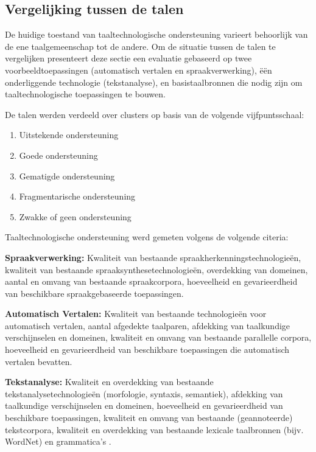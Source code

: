 \documentclass[]{../../metanetpaper}
\begin{document}
\begin{multicols}{2}
\subsection{Vergelijking tussen de talen}

De huidige toestand van taaltechnologische ondersteuning  varieert behoorlijk van de ene taalgemeenschap tot de andere. Om de situatie tussen de talen te vergelijken presenteert deze sectie een evaluatie gebaseerd op twee voorbeeldtoepassingen (automatisch vertalen en spraakverwerking), {\"e}{\"e}n onderliggende technologie (tekstanalyse), en basistaalbronnen die nodig zijn om taaltechnologische toepassingen te bouwen.

De talen werden verdeeld over clusters op basis van de volgende vijfpuntsschaal:

\begin{enumerate}
\item Uitstekende ondersteuning 
\item Goede ondersteuning
\item Gematigde ondersteuning
\item  Fragmentarische ondersteuning
\item Zwakke of geen ondersteuning
\end{enumerate}

Taaltechnologische ondersteuning werd gemeten volgens de volgende citeria:

\textbf{Spraakverwerking:} Kwaliteit van bestaande spraakherkenningstechnologie{\"e}n, kwaliteit van bestaande spraaksynthesetechnologie{\"e}n, overdekking van domeinen, aantal en omvang van bestaande spraakcorpora, hoeveelheid en gevarieerdheid van beschikbare spraakgebaseerde toepassingen.

\textbf{Automatisch Vertalen:} Kwaliteit van bestaande technologie{\"e}n voor automatisch vertalen, aantal afgedekte taalparen, afdekking van taalkundige verschijnselen en domeinen, kwaliteit en omvang van bestaande parallelle corpora, hoeveelheid en gevarieerdheid van beschikbare  toepassingen die automatisch vertalen bevatten.

\textbf{Tekstanalyse:} Kwaliteit en overdekking van bestaande tekstanalysetechnologie{\"e}n (morfologie, syntaxis, semantiek), afdekking van taalkundige verschijnselen en domeinen, hoeveelheid en gevarieerdheid van beschikbare  toepassingen, kwaliteit en omvang van bestaande (geannoteerde) tekstcorpora, kwaliteit en overdekking van bestaande lexicale taalbronnen (bijv. WordNet) en grammatica’s .


\end{multicols}
\end{document}
